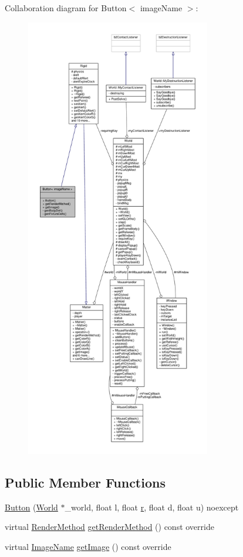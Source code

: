 Collaboration diagram for Button$<$ image\+Name $>$\+:
\nopagebreak
\begin{figure}[H]
\begin{center}
\leavevmode
\includegraphics[height=550pt]{classButton__coll__graph}
\end{center}
\end{figure}
\subsection*{Public Member Functions}
\begin{DoxyCompactItemize}
\item 
\hyperlink{classButton_a36705b8de68995c157c107af83e94644}{Button} (\hyperlink{classWorld}{World} $\ast$\+\_\+world, float l, float \hyperlink{image_8h_a62969232668331297e2dca1ae2ddd10d}{r}, float d, float u) noexcept
\item 
virtual \hyperlink{classMatter_ade1ce1bf81f25377f689d103cd431907}{Render\+Method} \hyperlink{classButton_a50233f0c531652154ecc0f8f7dc26571}{get\+Render\+Method} () const override
\item 
virtual \hyperlink{image_8h_af9361b398b5cfcafbe93f82e8eaeb080}{Image\+Name} \hyperlink{classButton_a75331f4a815ee394a223812681460e09}{get\+Image} () const override
\end{DoxyCompactItemize}
